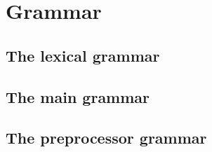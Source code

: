 %
%
%
%
%
%
%

\chapter{Grammar}

\section{The lexical grammar}

\label{section:lex-gram-summary}

\begin{small}
\begin{rules}

\end{rules}
\end{small}

\section{The main grammar}

\label{section:main-gram-summary}

\begin{small}
\begin{rules}

\end{rules}
\end{small}

\section{The preprocessor grammar}

\label{section:preproc-gram-summary}

\begin{small}
\begin{rules}

\end{rules}
\end{small}
